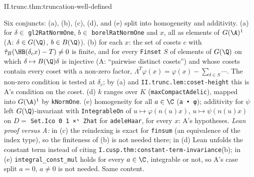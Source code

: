 \begin{tfformal}{II.trunc.thm:truncation-well-defined}
\begin{tffidelity}
Six conjuncts: (a), (b), (c), (d), and (e) split into homogeneity and additivity. (a) for $\delta\in$ \texttt{gl2RatNormOne}, $b\in$ \texttt{borelRatNormOne} and $x$, all as elements of $G(\A)^1$ (A: $\delta\in G(\Q)$, $b\in B(\Q)$). (b) for each $x$: the set of cosets $c$ with $\hat\tau_B(\HB(\delta_cx)-T)\ne0$ is finite, and for every \texttt{Finset} $S$ of elements of $G(\Q)$ on which $\delta\mapsto B(\Q)\delta$ is injective (A: ``pairwise distinct cosets'') and whose cosets contain every coset with a non-zero factor, $\Lambda^T\varphi(x)=\varphi(x)-\sum_{\delta\in S}\cdots$. The non-zero condition is tested at $\delta_c$; by (a) and \texttt{II.trunc.lem:coset-height} this is A's condition on the coset. (d) $k$ ranges over $K$ (\texttt{maxCompactAdelic}), mapped into $G(\A)^1$ by \texttt{kNormOne}. (e) homogeneity for all $a\in\C$ (\texttt{a • φ}); additivity for $\psi$ left $G(\Q)$-invariant with \texttt{IntegrableOn} of $u\mapsto\varphi(n(u)x)$, $u\mapsto\psi(n(u)x)$ on $D=$ \texttt{Set.Ico 0 1 ×ˢ Zhat} for \texttt{adeleHaar}, for every $x$: A's hypotheses. \emph{Lean proof versus A:} in (c) the reindexing is exact for \texttt{finsum} (an equivalence of the index type), so the finiteness of (b) is not needed there; in (d) Lean unfolds the constant term instead of citing \texttt{I.cusp.thm:constant-term-invariance}(b); in (e) \texttt{integral\_const\_mul} holds for every $a\in\C$, integrable or not, so A's case split $a=0$, $a\ne0$ is not needed. Same content.
\end{tffidelity}
\end{tfformal}
